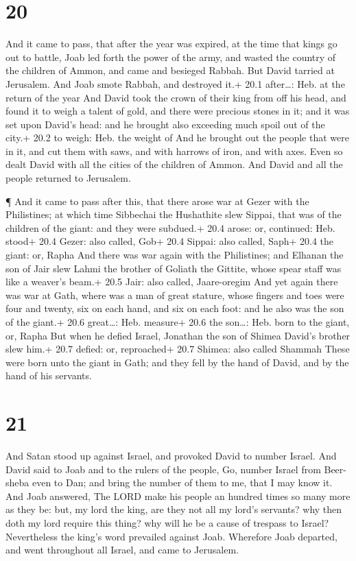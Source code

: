 \hypertarget{section-19}{%
\section{20}\label{section-19}}

 And it came to pass, that after the year was expired, at
the time that kings go out to battle, Joab led forth the power of the
army, and wasted the country of the children of Ammon, and came and
besieged Rabbah. But David tarried at Jerusalem. And Joab smote Rabbah,
and destroyed it.+ 20.1 after\ldots: Heb. at the return of the year
 And David took the crown of their king from off his head,
and found it to weigh a talent of gold, and there were precious stones
in it; and it was set upon David's head: and he brought also exceeding
much spoil out of the city.+ 20.2 to weigh: Heb. the weight of
 And he brought out the people that were in it, and cut them
with saws, and with harrows of iron, and with axes. Even so dealt David
with all the cities of the children of Ammon. And David and all the
people returned to Jerusalem.

 ¶ And it came to pass after this, that there arose war at
Gezer with the Philistines; at which time Sibbechai the Hushathite slew
Sippai, that was of the children of the giant: and they were subdued.+
20.4 arose: or, continued: Heb. stood+ 20.4 Gezer: also called, Gob+
20.4 Sippai: also called, Saph+ 20.4 the giant: or, Rapha 
And there was war again with the Philistines; and Elhanan the son of
Jair slew Lahmi the brother of Goliath the Gittite, whose spear staff
was like a weaver's beam.+ 20.5 Jair: also called, Jaare-oregim
 And yet again there was war at Gath, where was a man of
great stature, whose fingers and toes were four and twenty, six on each
hand, and six on each foot: and he also was the son of the giant.+ 20.6
great\ldots: Heb. measure+ 20.6 the son\ldots: Heb. born to the giant,
or, Rapha  But when he defied Israel, Jonathan the son of
Shimea David's brother slew him.+ 20.7 defied: or, reproached+ 20.7
Shimea: also called Shammah  These were born unto the giant
in Gath; and they fell by the hand of David, and by the hand of his
servants.

\hypertarget{section-20}{%
\section{21}\label{section-20}}

 And Satan stood up against Israel, and provoked David to
number Israel.  And David said to Joab and to the rulers of
the people, Go, number Israel from Beer-sheba even to Dan; and bring the
number of them to me, that I may know it.  And Joab
answered, The LORD make his people an hundred times so many more as they
be: but, my lord the king, are they not all my lord's servants? why then
doth my lord require this thing? why will he be a cause of trespass to
Israel?  Nevertheless the king's word prevailed against
Joab. Wherefore Joab departed, and went throughout all Israel, and came
to Jerusalem.


